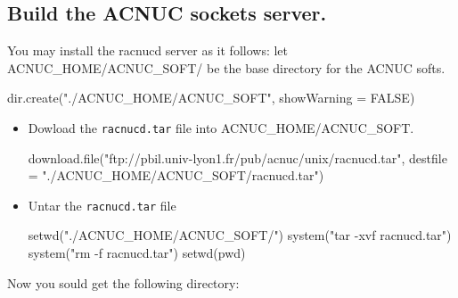 \documentclass{article}
\begin{document}
\subsection{Build the ACNUC sockets server.}

You may install the racnucd server as it follows:
let ACNUC\_HOME/ACNUC\_SOFT/ be the base directory for the ACNUC softs.

\begin{Schunk}
\begin{Sinput}
 dir.create("./ACNUC_HOME/ACNUC_SOFT", showWarning = FALSE)
\end{Sinput}
\end{Schunk}

\begin{itemize}
\item Dowload the \texttt{racnucd.tar} file into ACNUC\_HOME/ACNUC\_SOFT.

\begin{Schunk}
\begin{Sinput}
 download.file("ftp://pbil.univ-lyon1.fr/pub/acnuc/unix/racnucd.tar",
 destfile = "./ACNUC_HOME/ACNUC_SOFT/racnucd.tar")
\end{Sinput}
\end{Schunk}

\item Untar the \texttt{racnucd.tar} file 

\begin{Schunk}
\begin{Sinput}
 setwd("./ACNUC_HOME/ACNUC_SOFT/")
 system("tar -xvf racnucd.tar")
 system("rm -f racnucd.tar")
 setwd(pwd)
\end{Sinput}
\end{Schunk}

\end{itemize}
Now you sould get the following directory:
\end{document}
